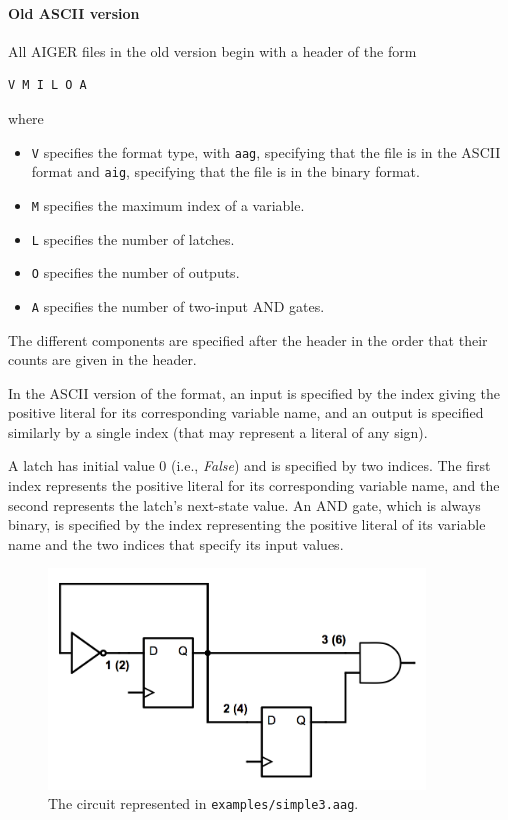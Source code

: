 \documentclass[12pt,a4paper,twoside,openright]{report}
\begin{document}
{{\paragraph{Old ASCII version}{
All AIGER files in the old version begin with a header of the form
\begin{verbatim}
V M I L O A
\end{verbatim}
where
\begin{itemize}
\item \verb,V, specifies the format type, with \verb,aag,, specifying that the file is in the ASCII format and \verb,aig,, specifying that the file is in the binary format.
\item \verb,M, specifies the maximum index of a variable.
\item \verb,L, specifies the number of latches.
\item \verb,O, specifies the number of outputs.
\item \verb,A, specifies the number of two-input AND gates.
\end{itemize}

The different components are specified after the header
in the order that their counts are given in the header.

In the ASCII version of the format, an input is specified by the
index giving the positive literal for its corresponding variable name,
and an output is specified similarly by a single index (that may represent
a literal of any sign).

A latch has initial value 0 (i.e., {\it False}) and is specified by two indices.
The first index represents the positive literal for its corresponding variable name,
and the second represents the latch's next-state value.
An AND gate, which is always binary,
is specified by the index representing the positive literal
of its variable name and the two indices that specify its input values.

\begin{figure}[t]
\centering
\includegraphics[width=100mm]{circuit.png}
\caption{The circuit represented in {\tt examples/simple3.aag}.}
\label{aagCircuit}
\end{figure}

}}}
\end{document}
